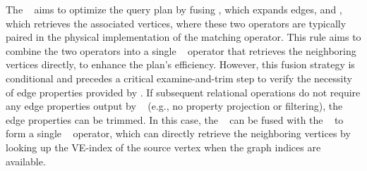 The \joinfuserule~ aims to optimize the query plan by fusing \expandedge, which expands edges, and \getvertex, which retrieves the associated vertices, where these two operators are typically paired in the physical implementation of the matching operator. This rule aims to combine the two operators into a single \expand~ operator that retrieves the neighboring vertices directly, to enhance the plan's efficiency.
However, this fusion strategy is conditional and precedes a critical examine-and-trim step to verify the necessity of edge properties provided by \expandedge. 
If subsequent relational operations do not require any edge properties output by \getvertex~ (e.g., no property projection or filtering), the edge properties can be trimmed.
In this case, the \expandedge~ can be fused with the \getvertex~ to form a single \expand~ operator, which can directly retrieve the neighboring vertices by looking up the VE-index of the source vertex when the graph indices are available.
%

